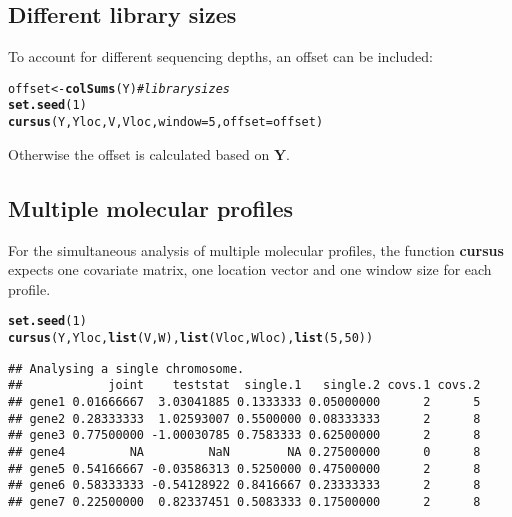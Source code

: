 \documentclass{article}\usepackage[]{graphicx}\usepackage[]{color}
\makeatletter
\newcommand{\hlnum}[1]{\textcolor[rgb]{0.686,0.059,0.569}{#1}}%
\newcommand{\hlcom}[1]{\textcolor[rgb]{0.678,0.584,0.686}{\textit{#1}}}%
\newcommand{\hlstd}[1]{\textcolor[rgb]{0.345,0.345,0.345}{#1}}%
\newcommand{\hlkwb}[1]{\textcolor[rgb]{0.69,0.353,0.396}{#1}}%
\newcommand{\hlkwc}[1]{\textcolor[rgb]{0.333,0.667,0.333}{#1}}%
\newcommand{\hlkwd}[1]{\textcolor[rgb]{0.737,0.353,0.396}{\textbf{#1}}}%
\newenvironment{kframe}{%
 \def\at@end@of@kframe{}%
 \ifinner\ifhmode%
  \def\at@end@of@kframe{\end{minipage}}%
  \begin{minipage}{\columnwidth}%
 \fi\fi%
 \def\FrameCommand##1{\hskip\@totalleftmargin \hskip-\fboxsep
 \colorbox{shadecolor}{##1}\hskip-\fboxsep
     \hskip-\linewidth \hskip-\@totalleftmargin \hskip\columnwidth}%
 \MakeFramed {\advance\hsize-\width
   \@totalleftmargin\z@ \linewidth\hsize
   \@setminipage}}%
 {\par\unskip\endMakeFramed%
 \at@end@of@kframe}
\newenvironment{knitrout}{}{} %
\makeatother
\begin{document}
\subsection{Different library sizes}
\label{GWA Different library sizes}

To account for different sequencing depths, an offset can be included:
\begin{knitrout}
\color{fgcolor}\begin{kframe}
\begin{alltt}
\hlstd{offset} \hlkwb{<-} \hlkwd{colSums}\hlstd{(Y)} \hlcom{# library sizes}
\hlkwd{set.seed}\hlstd{(}\hlnum{1}\hlstd{)}
\hlkwd{cursus}\hlstd{(Y,Yloc,V,Vloc,}\hlkwc{window}\hlstd{=}\hlnum{5}\hlstd{,}\hlkwc{offset}\hlstd{=offset)}
\end{alltt}
\end{kframe}
\end{knitrout}
Otherwise the offset is calculated based on $\boldsymbol{Y}$.

\newpage

\subsection{Multiple molecular profiles}
\label{GWA Multiple molecular profiles}

For the simultaneous analysis of multiple molecular profiles, the function \textbf{cursus} expects one covariate matrix, one location vector and one window size for each profile.

\begin{knitrout}
\color{fgcolor}\begin{kframe}
\begin{alltt}
\hlkwd{set.seed}\hlstd{(}\hlnum{1}\hlstd{)}
\hlkwd{cursus}\hlstd{(Y,Yloc,}\hlkwd{list}\hlstd{(V,W),}\hlkwd{list}\hlstd{(Vloc,Wloc),}\hlkwd{list}\hlstd{(}\hlnum{5}\hlstd{,}\hlnum{50}\hlstd{))}
\end{alltt}
\begin{verbatim}
## Analysing a single chromosome.
##            joint    teststat  single.1   single.2 covs.1 covs.2
## gene1 0.01666667  3.03041885 0.1333333 0.05000000      2      5
## gene2 0.28333333  1.02593007 0.5500000 0.08333333      2      8
## gene3 0.77500000 -1.00030785 0.7583333 0.62500000      2      8
## gene4         NA         NaN        NA 0.27500000      0      8
## gene5 0.54166667 -0.03586313 0.5250000 0.47500000      2      8
## gene6 0.58333333 -0.54128922 0.8416667 0.23333333      2      8
## gene7 0.22500000  0.82337451 0.5083333 0.17500000      2      8
\end{verbatim}
\end{kframe}
\end{knitrout}
\end{document}
